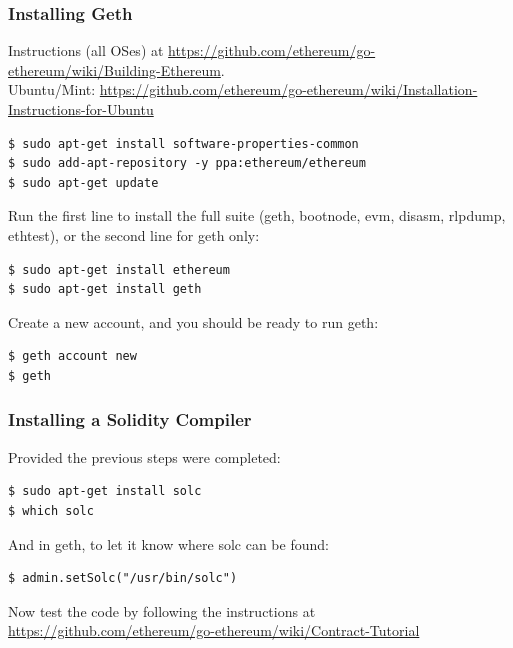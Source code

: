 \begin{frame}[fragile]
	\frametitle{Installing Geth}
	Instructions (all OSes) at {\normalsize\url{https://github.com/ethereum/go-ethereum/wiki/Building-Ethereum}}.\\
	Ubuntu/Mint: {\normalsize\url{https://github.com/ethereum/go-ethereum/wiki/Installation-Instructions-for-Ubuntu}}\\
	\vspace{.3em}
	\begin{Verbatim}[fontsize=\tiny]
$ sudo apt-get install software-properties-common
$ sudo add-apt-repository -y ppa:ethereum/ethereum
$ sudo apt-get update
	\end{Verbatim}
	Run the first line to install the full suite (geth, bootnode, evm, disasm, rlpdump, ethtest), or the second line for geth only:
	\vspace{.3em}
	\begin{Verbatim}[fontsize=\tiny]
$ sudo apt-get install ethereum
$ sudo apt-get install geth
	\end{Verbatim}
	Create a new account, and you should be ready to run geth:
	\vspace{.3em}
	\begin{Verbatim}[fontsize=\tiny]
$ geth account new 
$ geth 
	\end{Verbatim}
\end{frame}

\begin{frame}[fragile]
	\frametitle{Installing a Solidity Compiler}
	Provided the previous steps were completed:
	\vspace{.5em}
	\begin{Verbatim}[fontsize=\tiny]
$ sudo apt-get install solc
$ which solc
	\end{Verbatim}
And in geth, to let it know where solc can be found:
	\vspace{.5em}
	\begin{Verbatim}[fontsize=\tiny]
$ admin.setSolc("/usr/bin/solc")
	\end{Verbatim}
	Now test the code by following the instructions at \url{https://github.com/ethereum/go-ethereum/wiki/Contract-Tutorial}
\end{frame}


